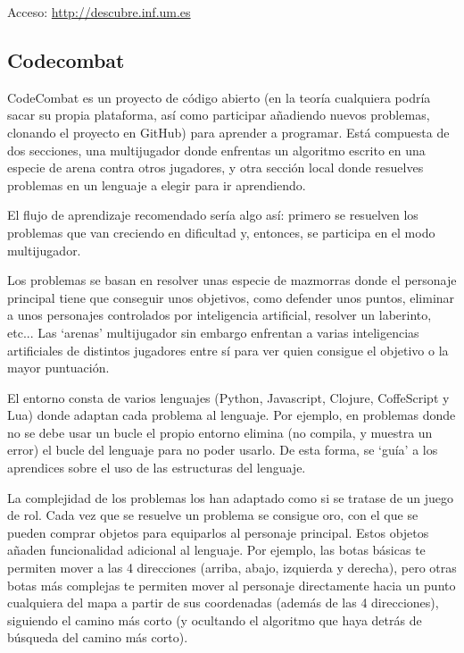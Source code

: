\documentclass{report}
\begin{document}
	\vspace{10px}
	
	Acceso: \url{http://descubre.inf.um.es}
	
	\subsection{Codecombat}
	
	CodeCombat es un proyecto de código abierto (en la teoría cualquiera podría sacar su propia plataforma, así como participar añadiendo nuevos problemas, clonando el proyecto en GitHub) para aprender a programar. Está compuesta de dos secciones, una multijugador donde enfrentas un algoritmo escrito en una especie de arena contra otros jugadores, y otra sección local donde resuelves problemas en un lenguaje a elegir para ir aprendiendo.
	
	\vspace{10px}
	
	El flujo de aprendizaje recomendado sería algo así: primero se resuelven los problemas que van creciendo en dificultad y, entonces, se participa en el modo multijugador. 
	
	\vspace{10px}
	
	Los problemas se basan en resolver unas especie de mazmorras donde el personaje principal tiene que conseguir unos objetivos, como defender unos puntos, eliminar a unos personajes controlados por inteligencia artificial, resolver un laberinto, etc... Las `arenas' multijugador sin embargo enfrentan a varias inteligencias artificiales de distintos jugadores entre sí para ver quien consigue el objetivo o la mayor puntuación.
	
	\vspace{10px}
	
	El entorno consta de varios lenguajes (Python, Javascript, Clojure, CoffeScript y Lua) donde adaptan cada problema al lenguaje. Por ejemplo, en problemas donde no se debe usar un bucle el propio entorno elimina (no compila, y muestra un error) el bucle del lenguaje para no poder usarlo. De esta forma, se `guía' a los aprendices sobre el uso de las estructuras del lenguaje.
	
	\vspace{10px}
	
	La complejidad de los problemas los han adaptado como si se tratase de un juego de rol. Cada vez que se resuelve un problema se consigue oro, con el que se pueden comprar objetos para equiparlos al personaje principal. Estos objetos añaden funcionalidad adicional al lenguaje. Por ejemplo, las botas básicas te permiten mover a las 4 direcciones (arriba, abajo, izquierda y derecha), pero otras botas más complejas te permiten mover al personaje directamente hacia un punto cualquiera del mapa a partir de sus coordenadas (además de las 4 direcciones), siguiendo el camino más corto (y ocultando el algoritmo que haya detrás de búsqueda del camino más corto).
	
\end{document}
